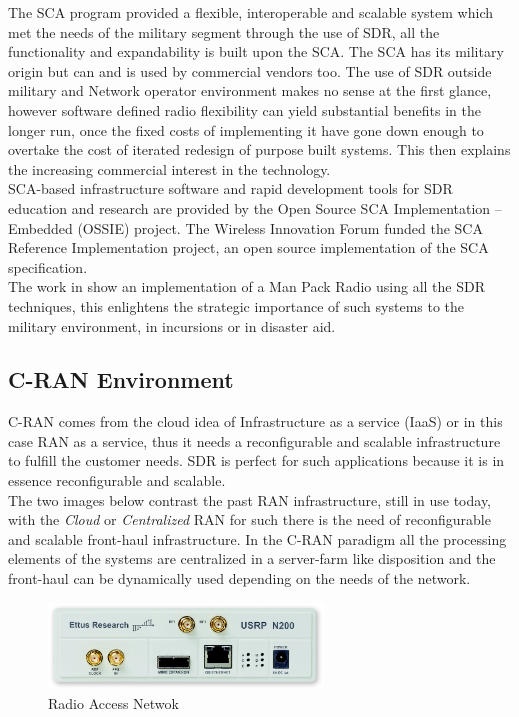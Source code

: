 The SCA program provided a flexible, interoperable and scalable system which met
the needs of the military segment through the use of SDR, all the functionality
and expandability is built upon the SCA. The SCA has its military origin but can
and is used by commercial vendors too. The use of SDR outside military and
Network operator environment makes no sense at the first glance, however
software defined radio flexibility can yield substantial benefits in
the longer run, once the fixed costs of implementing it have gone down enough to
overtake the cost of iterated redesign of purpose built systems. This then
explains the increasing commercial interest in the technology.\\

SCA-based infrastructure software and rapid development tools for SDR education
and research are provided by the Open Source SCA Implementation – Embedded
(OSSIE) project. The Wireless Innovation Forum funded the SCA Reference
Implementation project, an open source implementation of the SCA specification.\\

The work in \cite{Chamberlain2005} show an implementation of a Man Pack Radio
using all the SDR techniques, this enlightens the strategic importance of such
systems to the military environment, in incursions or in disaster aid.

\subsection{C-RAN Environment}

C-RAN comes from the cloud idea of Infrastructure as a service (IaaS) or in this
case RAN as a service, thus it needs a reconfigurable and scalable
infrastructure to fulfill the customer needs. SDR is perfect for such
applications because  it is in essence reconfigurable and scalable.\\

The two images below contrast the past RAN infrastructure, still in use today,
with the \emph{Cloud} or \emph{Centralized} RAN for such there is the need of
reconfigurable and scalable front-haul infrastructure. In the C-RAN paradigm all
the processing elements of the systems are centralized in a server-farm like
disposition and the front-haul can be dynamically used depending on the needs of
the network.

\begin{figure}[htbp]
    \centering
    \includegraphics[width=0.65\textwidth]{./figures/usrp}
    \caption{ Radio Access Netwok
    \label{fig:ran}}
\end{figure}

